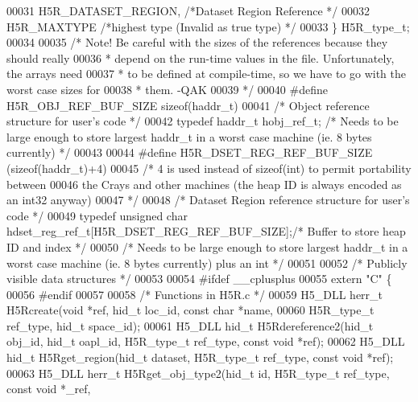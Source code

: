 \begin{DoxyCode}
00031     H5R\_DATASET\_REGION,         \textcolor{comment}{/*Dataset Region Reference                   */}
00032     H5R\_MAXTYPE                 \textcolor{comment}{/*highest type (Invalid as true type)        */}
00033 \} H5R\_type\_t;
00034 
00035 \textcolor{comment}{/* Note! Be careful with the sizes of the references because they should really}
00036 \textcolor{comment}{ * depend on the run-time values in the file.  Unfortunately, the arrays need}
00037 \textcolor{comment}{ * to be defined at compile-time, so we have to go with the worst case sizes for}
00038 \textcolor{comment}{ * them.  -QAK}
00039 \textcolor{comment}{ */}
00040 \textcolor{preprocessor}{#define H5R\_OBJ\_REF\_BUF\_SIZE    sizeof(haddr\_t)}
00041 \textcolor{comment}{/* Object reference structure for user's code */}
00042 \textcolor{keyword}{typedef} haddr\_t hobj\_ref\_t; \textcolor{comment}{/* Needs to be large enough to store largest haddr\_t in a worst case machine
       (ie. 8 bytes currently) */}
00043 
00044 \textcolor{preprocessor}{#define H5R\_DSET\_REG\_REF\_BUF\_SIZE    (sizeof(haddr\_t)+4)}
00045 \textcolor{comment}{/* 4 is used instead of sizeof(int) to permit portability between}
00046 \textcolor{comment}{   the Crays and other machines (the heap ID is always encoded as an int32 anyway)}
00047 \textcolor{comment}{*/}
00048 \textcolor{comment}{/* Dataset Region reference structure for user's code */}
00049 \textcolor{keyword}{typedef} \textcolor{keywordtype}{unsigned} \textcolor{keywordtype}{char} hdset\_reg\_ref\_t[H5R\_DSET\_REG\_REF\_BUF\_SIZE];\textcolor{comment}{/* Buffer to store heap ID and index */}
00050 \textcolor{comment}{/* Needs to be large enough to store largest haddr\_t in a worst case machine (ie. 8 bytes currently) plus
       an int */}
00051 
00052 \textcolor{comment}{/* Publicly visible data structures */}
00053 
00054 \textcolor{preprocessor}{#ifdef \_\_cplusplus}
00055 \textcolor{keyword}{extern} \textcolor{stringliteral}{"C"} \{
00056 \textcolor{preprocessor}{#endif}
00057 
00058 \textcolor{comment}{/* Functions in H5R.c */}
00059 H5\_DLL herr\_t H5Rcreate(\textcolor{keywordtype}{void} *ref, hid\_t loc\_id, \textcolor{keyword}{const} \textcolor{keywordtype}{char} *name,
00060              H5R\_type\_t ref\_type, hid\_t space\_id);
00061 H5\_DLL hid\_t H5Rdereference2(hid\_t obj\_id, hid\_t oapl\_id, H5R\_type\_t ref\_type, \textcolor{keyword}{const} \textcolor{keywordtype}{void} *ref);
00062 H5\_DLL hid\_t H5Rget\_region(hid\_t dataset, H5R\_type\_t ref\_type, \textcolor{keyword}{const} \textcolor{keywordtype}{void} *ref);
00063 H5\_DLL herr\_t H5Rget\_obj\_type2(hid\_t \textcolor{keywordtype}{id}, H5R\_type\_t ref\_type, \textcolor{keyword}{const} \textcolor{keywordtype}{void} *\_ref,

\end{DoxyCode}

